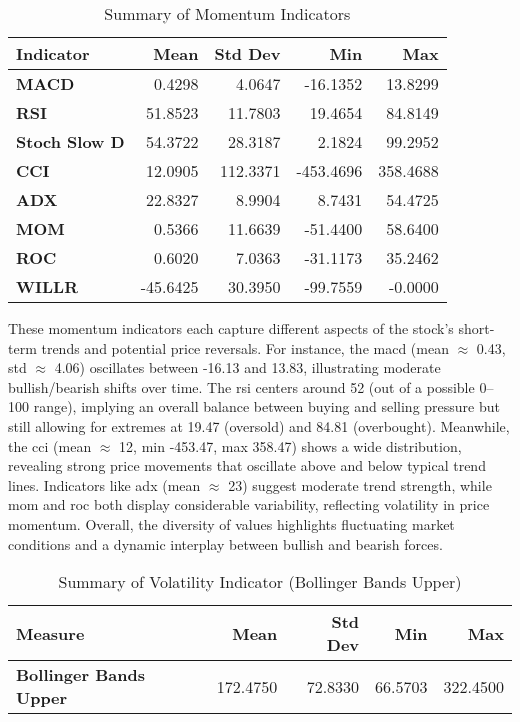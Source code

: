 \begin{table}[H]
\centering
\caption{Summary of Momentum Indicators}
\label{tab:momentum-indicators}
\begin{tabular}{lrrrr}
\hline
\textbf{Indicator} & \textbf{Mean} & \textbf{Std Dev} & \textbf{Min} & \textbf{Max}\\
\hline\hline
\textbf{MACD}         & 0.4298   & 4.0647   & -16.1352 & 13.8299  \\
\textbf{RSI}          & 51.8523  & 11.7803  & 19.4654  & 84.8149  \\
\textbf{Stoch Slow D} & 54.3722  & 28.3187  & 2.1824   & 99.2952  \\
\textbf{CCI}          & 12.0905  & 112.3371 & -453.4696 & 358.4688 \\
\textbf{ADX}          & 22.8327  & 8.9904   & 8.7431   & 54.4725  \\
\textbf{MOM}          & 0.5366   & 11.6639  & -51.4400 & 58.6400  \\
\textbf{ROC}          & 0.6020   & 7.0363   & -31.1173 & 35.2462  \\
\textbf{WILLR}        & -45.6425 & 30.3950  & -99.7559 & -0.0000  \\
\hline
\end{tabular}
\end{table}

These momentum indicators each capture different aspects of the stock’s short-term trends and
potential price reversals. For instance, 
the \acrshort{macd} (mean $\approx$ 0.43, std $\approx$ 4.06) 
oscillates between -16.13 and 13.83, illustrating moderate bullish/bearish shifts over time.
The \acrshort{rsi} centers around 52 (out of a possible 0–100 range), implying an 
overall balance between buying and selling pressure but still allowing for extremes at 
19.47 (oversold) and 84.81 (overbought). Meanwhile, the 
\acrshort{cci} (mean $\approx$ 12, min -453.47, max 358.47) shows a wide 
distribution, revealing strong price movements that oscillate above and below typical 
trend lines. Indicators like \acrshort{adx} (mean $\approx$ 23) suggest moderate trend 
strength, while \acrshort{mom} and \acrshort{roc} both display considerable 
variability, reflecting volatility in price momentum. Overall,
the diversity of values highlights fluctuating market conditions and a dynamic interplay
between bullish and bearish forces.

\begin{table}[H]
\centering
\caption{Summary of Volatility Indicator (Bollinger Bands Upper)}
\label{tab:volatility-indicator}
\begin{tabular}{lrrrr}
\hline
\textbf{Measure} & \textbf{Mean} & \textbf{Std Dev} & \textbf{Min} & \textbf{Max}\\
\hline\hline
\textbf{Bollinger Bands Upper} & 172.4750 & 72.8330 & 66.5703 & 322.4500 \\
\hline
\end{tabular}
\end{table}

